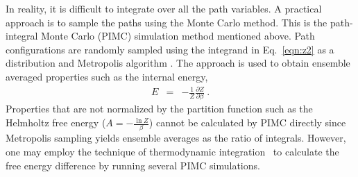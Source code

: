 \documentclass[12pt]{iopart}
\begin{document}
In reality, it is difficult to integrate over all the path variables. 
A practical approach is to sample the paths using the Monte Carlo method.
This is  the path-integral Monte Carlo (PIMC) simulation method \cite{ceperley_rmp_1995} mentioned above. 
Path configurations are randomly sampled using the integrand in Eq.~\ref{eqn:z2} as a distribution and Metropolis algorithm \cite{metropolis_random}.
The approach is used to obtain ensemble averaged properties such as the internal energy,
\begin{eqnarray}
E&=&-\frac{1}{Z}\frac{\partial Z}{\partial \beta}~.
\end{eqnarray}
Properties that are not normalized by the partition function such as the Helmholtz free energy ($A=-\frac{ \ln Z}{\beta}$) cannot be calculated by PIMC directly since Metropolis sampling yields ensemble averages as the ratio of integrals.
However, one may employ the technique of thermodynamic integration~\cite{kirk_tdi,briels_tdi,schlitter_tdi,sprik_tdi,kastner_thermo_int} to calculate the free energy difference by running several PIMC simulations.
\end{document}
